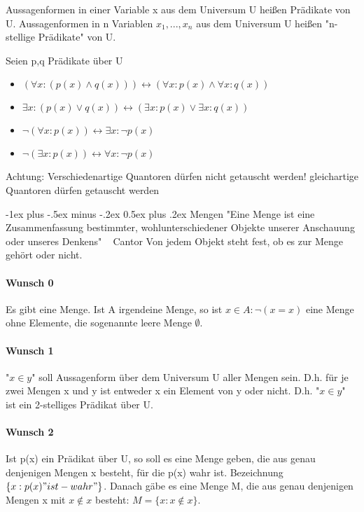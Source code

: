 \documentclass[a4paper]{article}
\makeatletter
\renewcommand{\section}{\@startsection{section}{1}{0mm}%
                                {-1ex plus -.5ex minus -.2ex}%
                                {0.5ex plus .2ex}%
                                {\normalfont\large\bfseries}}
\makeatother
\begin{document}
\begin{multicols}{3}
    Aussagenformen in einer Variable x aus dem Universum U heißen Prädikate von U. Aussagenformen in n Variablen $x_1,...,x_n$ aus dem Universum U heißen "n-stellige Prädikate" von U.
    
    Seien p,q Prädikate über U
    \begin{itemize}
        \item $(\forall x: (p(x) \wedge q(x)))\leftrightarrow (\forall x: p(x) \wedge \forall x: q(x))$
        \item $\exists x: (p(x) \vee q(x)) \leftrightarrow (\exists x: p(x) \vee \exists x: q(x))$
        \item $\neg (\forall x:p(x))\leftrightarrow \exists x: \neg p(x)$
        \item $\neg(\exists x:p(x))\leftrightarrow \forall x:\neg p(x)$
    \end{itemize}
    Achtung: Verschiedenartige Quantoren dürfen nicht getauscht werden! gleichartige Quantoren dürfen getauscht werden
    
    \section{Mengen}
    "Eine Menge ist eine Zusammenfassung bestimmter, wohlunterschiedener Objekte unserer Anschauung oder unseres Denkens" ~ Cantor
    Von jedem Objekt steht fest, ob es zur Menge gehört oder nicht.
    
    \paragraph{Wunsch 0}
    Es gibt eine Menge. Ist A irgendeine Menge, so ist ${x \in A: \neg (x=x)}$ eine Menge ohne Elemente, die sogenannte leere Menge $\emptyset$.
    
    \paragraph{Wunsch 1}
    "$x\in y$" soll Aussagenform über dem Universum U aller Mengen sein. D.h. für je zwei Mengen x und y ist entweder x ein Element von y oder nicht. D.h. "$x\in y$" ist ein 2-stelliges Prädikat über U.
    
    \paragraph{Wunsch 2}
    Ist p(x) ein Prädikat über U, so soll es eine Menge geben, die aus genau denjenigen Mengen x besteht, für die p(x) wahr ist. Bezeichnung $\{x:p(x) "ist-wahr" \}$.
    Danach gäbe es eine Menge M, die aus genau denjenigen Mengen x mit $x\not\in x$ besteht: $M=\{x:x\not \in x\}$.
    

\end{multicols}
\end{document}
